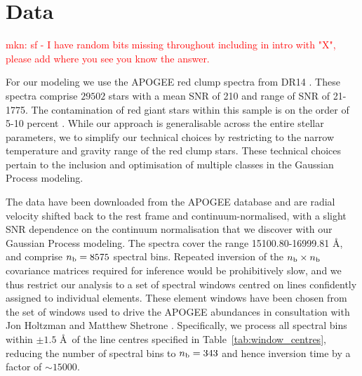 \documentclass[a4paper,fleqn,usenatbib]{mnras}
\newcommand{\nb}{n_{\rm b}}
\begin{document}
\section{Data} 

\textcolor{red}{mkn: sf  - I have random bits missing throughout including in intro with "X", please add where you see you know the answer.}

For our modeling we use the APOGEE red clump spectra from DR14 \citep{Majewski2017, Bovy2015}. These spectra comprise $29502$ stars with a mean SNR of 210 and range of SNR of 21-1775.  The contamination of red giant stars within this sample is on the order of 5-10 percent \citep{Bovy2015}. While our approach is generalisable across the entire stellar parameters, we to simplify our technical choices by restricting to the narrow temperature and gravity range of the red clump stars. These technical choices pertain to the inclusion and optimisation of multiple classes in the Gaussian Process modeling.


The data have been downloaded from the APOGEE database and are radial velocity shifted back to the rest frame and continuum-normalised, with a slight SNR dependence on the continuum normalisation that we discover with our Gaussian Process modeling. The spectra cover the range 15100.80-16999.81 \AA, and comprise $\nb = 8575$ spectral bins. Repeated inversion of the $\nb \times \nb$ covariance matrices required for inference would be prohibitively slow, and we thus restrict our analysis to a set of spectral windows centred on lines confidently assigned to individual elements. These element windows have been chosen from the set of windows used to drive the APOGEE abundances in consultation with Jon Holtzman and Matthew Shetrone \citep{Holtzman2015, Shetrone2015}. Specifically, we process all spectral bins within $\pm 1.5$ \AA\ of the line centres specified in Table~\ref{tab:window_centres}, reducing the number of spectral bins to $\nb = 343$ and hence inversion time by a factor of $\sim15000$. %
\end{document}
